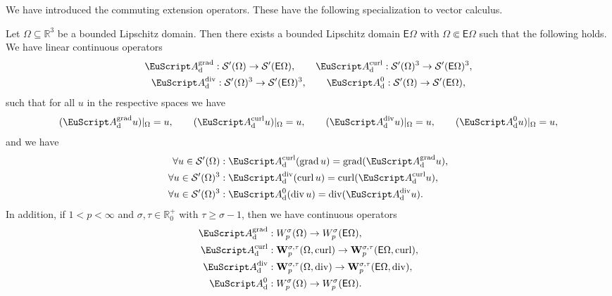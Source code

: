 \documentclass[10pt,a4paper]{amsart}
\theoremstyle{definition}
\theoremstyle{remark}
\numberwithin{equation}{section}
\newcommand{\bbR}{{\mathbb R}}
\newcommand{\bfW}{{\mathbf W}}
\newcommand{\calS}{{\mathcal S}}
\newcommand{\euA}{{\EuScript A}}
\newcommand{\sfE}{{\mathsf E}}
\renewcommand{\restriction}{|}
\newcommand{\cartan}{{\mathrm d}}
\newcommand{\Domain}{{\Omega}}
\newcommand{\extDomain}{{\sfE\Omega}}
\newcommand{\kommErweiterung}{\euA_{\cartan}}
\newcommand{\grad}{\operatorname{grad}}
\newcommand{\curl}{\operatorname{curl}}
\newcommand{\divergence}{\operatorname{div}}
\begin{document}
We have introduced the commuting extension operators.
These have the following specialization to vector calculus. 

\begin{theorem}
    Let $\Domain \subseteq \bbR^{3}$ be a bounded Lipschitz domain. 
    Then there exists a bounded Lipschitz domain $\extDomain$ with $\Domain \Subset \extDomain$ such that the following holds.
    We have linear continuous operators 
    \begin{gather*}
        \kommErweiterung^{\grad} : \calS'(\Domain) \to \calS'(\extDomain),
        \qquad
        \kommErweiterung^{\curl} : \calS'(\Domain)^{3} \to \calS'(\extDomain)^{3},
        \\
        \kommErweiterung^{\divergence} : \calS'(\Domain)^{3} \to \calS'(\extDomain)^{3},
        \qquad 
        \kommErweiterung^{0} : \calS'(\Domain) \to \calS'(\extDomain)
        ,
    \end{gather*}
    such that for all $u$ in the respective spaces we have 
    \begin{align*}
        ( \kommErweiterung^{\grad} u) \restriction_{\Domain} = u,
        \qquad 
        ( \kommErweiterung^{\curl} u) \restriction_{\Domain} = u,
        \qquad 
        ( \kommErweiterung^{\divergence} u) \restriction_{\Domain} = u,
        \qquad 
        ( \kommErweiterung^{0} u) \restriction_{\Domain} = u,
    \end{align*}
    and we have 
    \begin{align*}
        \forall u \in \calS'(\Domain)
        &: \kommErweiterung^{\curl} (\grad u) = \grad (\kommErweiterung^{\grad} u),
        \\
        \forall u \in \calS'(\Domain)^{3}
        &: \kommErweiterung^{\divergence} (\curl u) = \curl (\kommErweiterung^{\curl} u),
        \\
        \forall u \in \calS'(\Domain)^{3}
        &: \kommErweiterung^{0} (\divergence u) = \divergence (\kommErweiterung^{\divergence} u).
    \end{align*}
    In addition, if $1 < p < \infty$ and $\sigma, \tau \in \bbR_{0}^{+}$ with $\tau \geq \sigma-1$, then we have continuous operators
    \begin{align*}
        \kommErweiterung^{\grad} &: W^{\sigma}_{p}(\Domain) \to W^{\sigma}_{p}(\extDomain),
        \\
        \kommErweiterung^{\curl} &: \bfW^{\sigma,\tau}_{p}(\Domain,\curl) \to \bfW^{\sigma,\tau}_{p}(\extDomain,\curl),
        \\
        \kommErweiterung^{\divergence} &: \bfW^{\sigma,\tau}_{p}(\Domain,\divergence) \to \bfW^{\sigma,\tau}_{p}(\extDomain,\divergence),
        \\
        \kommErweiterung^{0} &: W^{\sigma}_{p}(\Domain) \to W^{\sigma}_{p}(\extDomain)
        .
    \end{align*}
\end{theorem}
\end{document}
